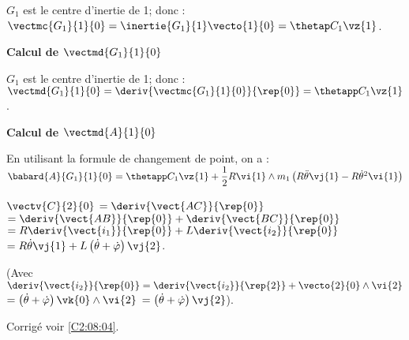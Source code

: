 $G_1$ est le centre d'inertie de 1; donc : 
$\vectmc{G_1}{1}{0} = \inertie{G_1}{1}\vecto{1}{0} = \thetap C_1 \vz{1}$.

\textbf{Calcul de $\vectmd{G_1}{1}{0}$}

$G_1$ est le centre d'inertie de 1; donc : 
$\vectmd{G_1}{1}{0} = \deriv{\vectmc{G_1}{1}{0}}{\rep{0}} = \thetapp C_1 \vz{1}$.

\textbf{Calcul de $\vectmd{A}{1}{0}$}

En utilisant la formule de changement de point, on a : 
$\babard{A}{G_1}{1}{0} = \thetapp C_1 \vz{1} + \dfrac{1}{2}R\vi{1} \wedge m_1 \left( R\ddot{\theta}\vj{1} - R\dot{\theta}^2\vi{1}\right)$

\else
\fi

\ifprof

$\vectv{C}{2}{0}$ $ = \deriv{\vect{AC}}{\rep{0}}$
$ = \deriv{\vect{AB}}{\rep{0}}+\deriv{\vect{BC}}{\rep{0}}$
$ = R\deriv{\vect{i_1}}{\rep{0}}+L\deriv{\vect{i_2}}{\rep{0}}$
$ = R\dot{\theta}\vj{1}+L\left( \dot{\theta}+\dot{\varphi}\right)\vj{2}$.

(Avec $\deriv{\vect{i_2}}{\rep{0}} = \deriv{\vect{i_2}}{\rep{2}} + \vecto{2}{0}\wedge \vi{2}$
$ = \left( \dot{\theta}+\dot{\varphi}\right)\vk{0}\wedge \vi{2}$ $ = \left( \dot{\theta}+\dot{\varphi}\right)\vj{2}$).

\else
\fi

\ifprof
\else
\fi

\ifcolle
{}
\else
\fi


\ifprof
\else
\begin{flushright}
\footnotesize{Corrigé  voir \ref{C2:08:04}.}
\end{flushright}%
\fi